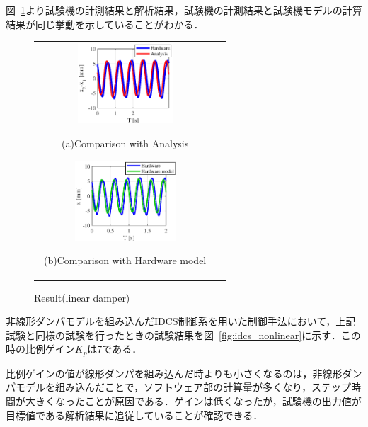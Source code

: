\documentclass{article_vdlab_sotsuron_youshi}
\begin{document}
図~\ref{fig:idcs_linear}より試験機の計測結果と解析結果，試験機の計測結果と試験機モデルの計算結果が同じ挙動を示していることがわかる．

\vspace*{3mm}
\begin{figure}[h]
  \begin{tabular}{cc}
  \begin{minipage}[t]{0.5\hsize}
  \begin{center}
    \includegraphics[height=30mm]{figure/sus_linear_5_3.eps}
    \end{center}
    \begin{center}
      \vspace{-3mm}
    \ (a)Comparison with Analysis\
    \end{center}
  \end{minipage}
  \begin{minipage}[t]{0.5\hsize}
     \begin{center}
      \includegraphics[height=30mm]{figure/idcs_linear_5_3.eps}
      \end{center}
      \begin{center}
        \vspace{-3mm}
      \ (b)Comparison with Hardware model\
    \end{center}
  \end{minipage}
  \end{tabular}
  \caption{Result(linear damper)}
    \label{fig:idcs_linear}
\end{figure}

非線形ダンパモデルを組み込んだIDCS制御系を用いた制御手法において，上記試験と同様の試験を行ったときの試験結果を図~\ref{fig:idcs_nonlinear}に示す．この時の比例ゲイン$K_p$は7である．

比例ゲインの値が線形ダンパを組み込んだ時よりも小さくなるのは，非線形ダンパモデルを組み込んだことで，ソフトウェア部の計算量が多くなり，ステップ時間が大きくなったことが原因である．ゲインは低くなったが，試験機の出力値が目標値である解析結果に追従していることが確認できる．
\end{document}
